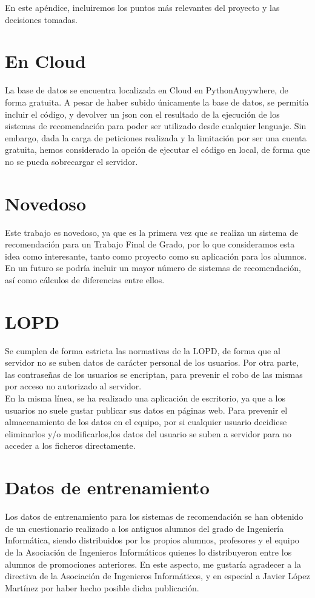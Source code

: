 En este apéndice, incluiremos los puntos más relevantes del proyecto y las decisiones tomadas. 
\section{En Cloud}
La base de datos se encuentra localizada en Cloud en PythonAnyywhere, de forma gratuita. A pesar de haber subido únicamente la base de datos, se permitía incluir el código, y devolver un json con el resultado de la ejecución de los sistemas de recomendación para poder ser utilizado desde cualquier lenguaje. Sin embargo, dada la carga de peticiones realizada y la limitación por ser una cuenta gratuita, hemos considerado la opción de ejecutar el código en local, de forma que no se pueda sobrecargar el servidor. 

\section{Novedoso}
Este trabajo es novedoso, ya que es la primera vez que se realiza un sistema de recomendación para un Trabajo Final de Grado, por lo que consideramos esta idea como interesante, tanto como proyecto como su aplicación para los alumnos.  En un futuro se podría incluir un mayor número de sistemas de recomendación, así como cálculos de diferencias entre ellos. 

\section{LOPD}
Se cumplen de forma estricta las normativas de la LOPD, de forma que al servidor no se suben datos de carácter personal de los usuarios. Por otra parte, las contraseñas de los usuarios se encriptan, para prevenir el robo de las mismas por acceso no autorizado al servidor. 
\\En la misma línea, se ha realizado una aplicación de escritorio, ya que a los usuarios no suele gustar publicar sus datos en páginas web. Para prevenir el almacenamiento de los datos en el equipo, por si cualquier usuario decidiese eliminarlos y/o modificarlos,los datos del usuario se suben a servidor para no acceder a los ficheros directamente. 


\section{Datos de entrenamiento}
Los datos de entrenamiento para los sistemas de recomendación se han obtenido de un cuestionario realizado a los antiguos alumnos del grado de Ingeniería Informática, siendo distribuidos por los propios alumnos, profesores y el equipo de la Asociación de Ingenieros Informáticos quienes lo distribuyeron entre los alumnos de promociones anteriores. En este aspecto, me gustaría agradecer a la directiva de la Asociación de Ingenieros Informáticos, y en especial a  Javier López Martínez  por haber hecho posible dicha publicación. 





